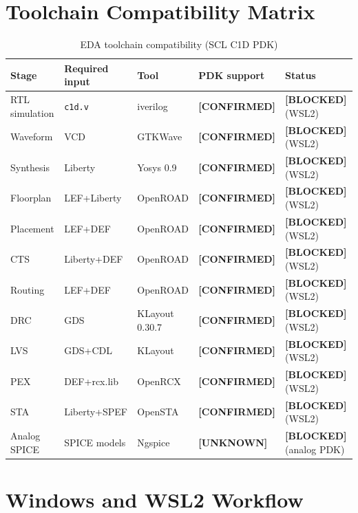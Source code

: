 \documentclass[11pt,a4paper]{article}
\newcommand{\unknown}{\textcolor{unknown}{\textbf{[UNKNOWN]}}}
\newcommand{\confirmed}{\textcolor{frozen}{\textbf{[CONFIRMED]}}}
\newcommand{\blocked}{\textcolor{unknown}{\textbf{[BLOCKED]}}}
\begin{document}
\section{Toolchain Compatibility Matrix}

\begin{table}[H]
  \centering
  \caption{EDA toolchain compatibility (SCL C1D PDK)}
  \scriptsize
  \begin{tabularx}{\textwidth}{p{3cm}p{2.8cm}p{2.5cm}Xp{2cm}}
    \toprule
    \textbf{Stage} & \textbf{Required input} & \textbf{Tool} & \textbf{PDK support} & \textbf{Status} \\
    \midrule
    RTL simulation & \texttt{c1d.v} & iverilog & \confirmed & \blocked (WSL2) \\
    Waveform & VCD & GTKWave & \confirmed & \blocked (WSL2) \\
    Synthesis & Liberty & Yosys 0.9 & \confirmed & \blocked (WSL2) \\
    Floorplan & LEF+Liberty & OpenROAD & \confirmed & \blocked (WSL2) \\
    Placement & LEF+DEF & OpenROAD & \confirmed & \blocked (WSL2) \\
    CTS & Liberty+DEF & OpenROAD & \confirmed & \blocked (WSL2) \\
    Routing & LEF+DEF & OpenROAD & \confirmed & \blocked (WSL2) \\
    DRC & GDS & KLayout 0.30.7 & \confirmed & \blocked (WSL2) \\
    LVS & GDS+CDL & KLayout & \confirmed & \blocked (WSL2) \\
    PEX & DEF+rcx.lib & OpenRCX & \confirmed & \blocked (WSL2) \\
    STA & Liberty+SPEF & OpenSTA & \confirmed & \blocked (WSL2) \\
    Analog SPICE & SPICE models & Ngspice & \unknown & \blocked (analog PDK) \\
    \bottomrule
  \end{tabularx}
\end{table}

\section{Windows and WSL2 Workflow}
\end{document}
